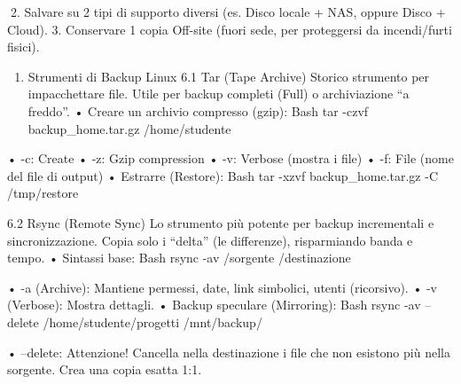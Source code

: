 \documentclass[11pt,a4paper]{article}
\providecommand{\tightlist}{%
  \setlength{\itemsep}{0pt}\setlength{\parskip}{0pt}}
\begin{document}
2. Salvare su 2 tipi di supporto diversi (es. Disco locale + NAS, oppure
Disco + Cloud). 3. Conservare 1 copia Off-site (fuori sede, per
proteggersi da incendi/furti fisici).

\begin{enumerate}
\def\labelenumi{\arabic{enumi}.}
\setcounter{enumi}{5}
\tightlist
\item
  Strumenti di Backup Linux 6.1 Tar (Tape Archive) Storico strumento per
  impacchettare file. Utile per backup completi (Full) o archiviazione
  ``a freddo''. • Creare un archivio compresso (gzip): Bash tar -czvf
  backup\_home.tar.gz /home/studente
\end{enumerate}

• -c: Create • -z: Gzip compression • -v: Verbose (mostra i file) • -f:
File (nome del file di output) • Estrarre (Restore): Bash tar -xzvf
backup\_home.tar.gz -C /tmp/restore

6.2 Rsync (Remote Sync) Lo strumento più potente per backup incrementali
e sincronizzazione. Copia solo i ``delta'' (le differenze), risparmiando
banda e tempo. • Sintassi base: Bash rsync -av /sorgente /destinazione

• -a (Archive): Mantiene permessi, date, link simbolici, utenti
(ricorsivo). • -v (Verbose): Mostra dettagli. • Backup speculare
(Mirroring): Bash rsync -av --delete /home/studente/progetti
/mnt/backup/

• --delete: Attenzione! Cancella nella destinazione i file che non
esistono più nella sorgente. Crea una copia esatta 1:1.


\end{document}

